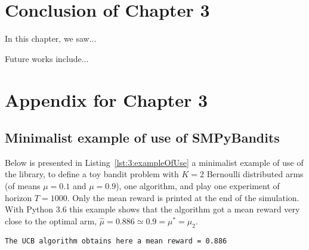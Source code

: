

\section{Conclusion of Chapter 3}
\label{sec:3:conclusion}

In this chapter, we saw...

Future works include...




\section{Appendix for Chapter 3}
\label{sec:3:appendix}


\subsection{Minimalist example of use of SMPyBandits}

Below is presented in Listing~\ref{lst:3:exampleOfUse} a minimalist example of use of the library, to define a toy bandit problem with $K=2$ Bernoulli distributed arms (of means $\mu=0.1$ and $\mu=0.9$), one \UCB{} algorithm, and play one experiment of horizon $T=1000$.
Only the mean reward is printed at the end of the simulation.
%
With Python 3.6 this example shows that the algorithm got a mean reward very close to the optimal arm, $\hat{\mu} = 0.886 \simeq 0.9 = \mu^* = \mu_2$.
\begin{verbatim}
The UCB algorithm obtains here a mean reward = 0.886
\end{verbatim}

\begin{small}
    \inputminted[linenos=true,numbersep=5pt,frame=lines,framesep=2mm]{python3}{2-Chapters/3-Chapter/src/example_of_use_of_SMPyBandits.py}
\end{small}


